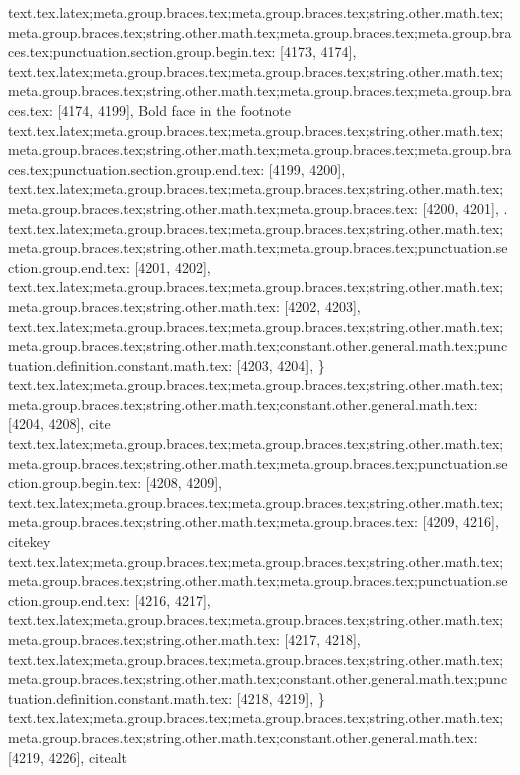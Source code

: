 {{{{{{{{{{{{{{{{{{{{{{{{{{{{{{{{{{{{{{{{{{{{{{{{{{{{{{{{{{{{{{{{{{{{{{{{{{{{{{{{{{{{{{{{{{{{{{{{{{{{{{{{{{{{{{{{{{{{{{{{{{{{{{{{{{{{{text.tex.latex;meta.group.braces.tex;meta.group.braces.tex;string.other.math.tex;meta.group.braces.tex;string.other.math.tex;meta.group.braces.tex;meta.group.braces.tex;punctuation.section.group.begin.tex: [4173, 4174], {{}
text.tex.latex;meta.group.braces.tex;meta.group.braces.tex;string.other.math.tex;meta.group.braces.tex;string.other.math.tex;meta.group.braces.tex;meta.group.braces.tex: [4174, 4199], {Bold face in the footnote}
text.tex.latex;meta.group.braces.tex;meta.group.braces.tex;string.other.math.tex;meta.group.braces.tex;string.other.math.tex;meta.group.braces.tex;meta.group.braces.tex;punctuation.section.group.end.tex: [4199, 4200], {}}
text.tex.latex;meta.group.braces.tex;meta.group.braces.tex;string.other.math.tex;meta.group.braces.tex;string.other.math.tex;meta.group.braces.tex: [4200, 4201], {.}
text.tex.latex;meta.group.braces.tex;meta.group.braces.tex;string.other.math.tex;meta.group.braces.tex;string.other.math.tex;meta.group.braces.tex;punctuation.section.group.end.tex: [4201, 4202], {}}
text.tex.latex;meta.group.braces.tex;meta.group.braces.tex;string.other.math.tex;meta.group.braces.tex;string.other.math.tex: [4202, 4203], {
}
text.tex.latex;meta.group.braces.tex;meta.group.braces.tex;string.other.math.tex;meta.group.braces.tex;string.other.math.tex;constant.other.general.math.tex;punctuation.definition.constant.math.tex: [4203, 4204], {\}
text.tex.latex;meta.group.braces.tex;meta.group.braces.tex;string.other.math.tex;meta.group.braces.tex;string.other.math.tex;constant.other.general.math.tex: [4204, 4208], {cite}
text.tex.latex;meta.group.braces.tex;meta.group.braces.tex;string.other.math.tex;meta.group.braces.tex;string.other.math.tex;meta.group.braces.tex;punctuation.section.group.begin.tex: [4208, 4209], {{}
text.tex.latex;meta.group.braces.tex;meta.group.braces.tex;string.other.math.tex;meta.group.braces.tex;string.other.math.tex;meta.group.braces.tex: [4209, 4216], {citekey}
text.tex.latex;meta.group.braces.tex;meta.group.braces.tex;string.other.math.tex;meta.group.braces.tex;string.other.math.tex;meta.group.braces.tex;punctuation.section.group.end.tex: [4216, 4217], {}}
text.tex.latex;meta.group.braces.tex;meta.group.braces.tex;string.other.math.tex;meta.group.braces.tex;string.other.math.tex: [4217, 4218], {
}
text.tex.latex;meta.group.braces.tex;meta.group.braces.tex;string.other.math.tex;meta.group.braces.tex;string.other.math.tex;constant.other.general.math.tex;punctuation.definition.constant.math.tex: [4218, 4219], {\}
text.tex.latex;meta.group.braces.tex;meta.group.braces.tex;string.other.math.tex;meta.group.braces.tex;string.other.math.tex;constant.other.general.math.tex: [4219, 4226], {citealt}
}}}}}}}}}}}}}}}}}}}}}}}}}}}}}}}}}}}}}}}}}}}}}}}}}}}}}}}}}}}}}}}}}}}}}}}}}}}}}}}}}}}}}}}}}}}}}}}}}}}}}}}}}}}}}}}}}}}}}}}}}}}}}}}}}}}}}}

